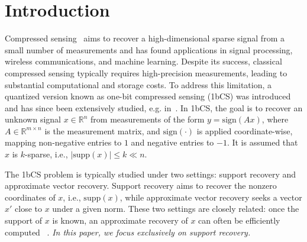\documentclass{article}
\newcommand{\supp}{\mathrm{supp}}
\newcommand{\sgn}{\mathrm{sign}}
\begin{document}
\begin{abstract}

\end{abstract}

\section{Introduction}\label{sec:intro}
Compressed sensing~\cite{CandesT06,Donoho06} aims to recover a high-dimensional sparse signal from a small number of measurements and has found applications in signal processing, wireless communications, and machine learning. Despite its success, classical compressed sensing typically requires high-precision measurements, leading to substantial computational and storage costs. To address this limitation, a quantized version known as one-bit compressed sensing (1bCS) was introduced~\cite{boufounos20081} and has since been extensively studied, 
e.g. in~\cite{li2018survey,plan2013one,baraniuk2010model,acharya2017improved,gopi2013one,zhang2014efficient,nakos2017fast,matsumoto2024robust,matsumoto2024binary}. In 1bCS, the goal is to recover an unknown signal $x\in\mathbb{R}^n$ from measurements of the form $y = \sgn(Ax)$, where $A \in \mathbb{R}^{m \times n}$ is the measurement matrix, and $\sgn(\cdot)$ is applied coordinate-wise, mapping non-negative entries to $1$ and negative entries to $-1$. It is assumed that $x$ is $k$-sparse, i.e., $|\supp(x)| \le k \ll n$.

The 1bCS problem is typically studied under two settings: support recovery and approximate vector recovery. Support recovery aims to recover the nonzero coordinates of $x$, i.e., $\supp(x)$, while approximate vector recovery seeks a vector $x'$ close to $x$ under a given norm. These two settings are closely related: once the support of $x$ is known, an approximate recovery of $x$ can often be efficiently computed ~\cite{gopi2013one,flodin2019superset}. \emph{In this paper, we focus exclusively on support recovery.}
\end{document}
